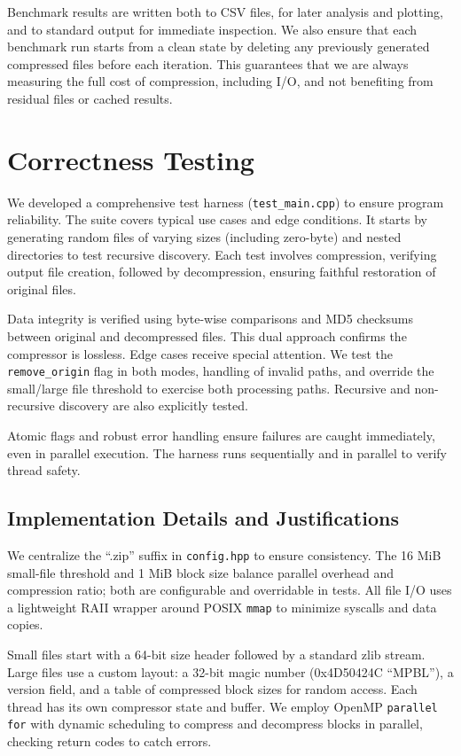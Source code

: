\documentclass[10pt]{article}
\begin{document}
Benchmark results are written both to CSV files, for later analysis and plotting, and to standard output for immediate inspection. We also ensure that each benchmark run starts from a clean state by deleting any previously generated compressed files before each iteration. This guarantees that we are always measuring the full cost of compression, including I/O, and not benefiting from residual files or cached results.

\section{Correctness Testing}
We developed a comprehensive test harness (\texttt{test\_main.cpp}) to ensure program reliability. The suite covers typical use cases and edge conditions. It starts by generating random files of varying sizes (including zero-byte) and nested directories to test recursive discovery. Each test involves compression, verifying output file creation, followed by decompression, ensuring faithful restoration of original files.

Data integrity is verified using byte-wise comparisons and MD5 checksums between original and decompressed files. This dual approach confirms the compressor is lossless. Edge cases receive special attention. We test the \texttt{remove\_origin} flag in both modes, handling of invalid paths, and override the small/large file threshold to exercise both processing paths. Recursive and non-recursive discovery are also explicitly tested.

Atomic flags and robust error handling ensure failures are caught immediately, even in parallel execution. The harness runs sequentially and in parallel to verify thread safety.

\subsection*{Implementation Details and Justifications}
We centralize the “.zip” suffix in \texttt{config.hpp} to ensure consistency. The 16 MiB small-file threshold and 1 MiB block size balance parallel overhead and compression ratio; both are configurable and overridable in tests. All file I/O uses a lightweight RAII wrapper around POSIX \texttt{mmap} to minimize syscalls and data copies.

Small files start with a 64-bit size header followed by a standard zlib stream. Large files use a custom layout: a 32-bit magic number (0x4D50424C “MPBL”), a version field, and a table of compressed block sizes for random access. Each thread has its own compressor state and buffer. We employ OpenMP \texttt{parallel for} with dynamic scheduling to compress and decompress blocks in parallel, checking return codes to catch errors.
\end{document}
